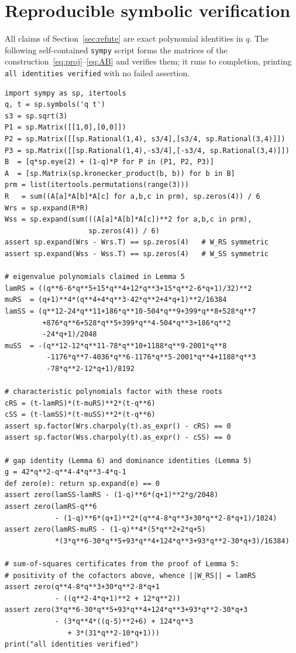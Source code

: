 \documentclass[11pt]{article}
\theoremstyle{definition}
\theoremstyle{remark}
\begin{document}
\newpage

\appendix
\section{Reproducible symbolic verification}\label{app:verify}

All claims of Section~\ref{sec:refute} are exact polynomial identities in $q$. The following
self-contained \texttt{sympy} script forms the matrices of the
construction~\eqref{eq:proj}--\eqref{eq:AB} and verifies them; it runs to completion, printing
\texttt{all identities verified} with no failed assertion.

{\footnotesize
\begin{verbatim}
import sympy as sp, itertools
q, t = sp.symbols('q t')
s3 = sp.sqrt(3)
P1 = sp.Matrix([[1,0],[0,0]])
P2 = sp.Matrix([[sp.Rational(1,4), s3/4],[s3/4, sp.Rational(3,4)]])
P3 = sp.Matrix([[sp.Rational(1,4),-s3/4],[-s3/4, sp.Rational(3,4)]])
B  = [q*sp.eye(2) + (1-q)*P for P in (P1, P2, P3)]
A  = [sp.Matrix(sp.kronecker_product(b, b)) for b in B]
prm = list(itertools.permutations(range(3)))
R   = sum((A[a]*A[b]*A[c] for a,b,c in prm), sp.zeros(4)) / 6
Wrs = sp.expand(R*R)
Wss = sp.expand(sum(((A[a]*A[b]*A[c])**2 for a,b,c in prm),
                    sp.zeros(4)) / 6)
assert sp.expand(Wrs - Wrs.T) == sp.zeros(4)   # W_RS symmetric
assert sp.expand(Wss - Wss.T) == sp.zeros(4)   # W_SS symmetric

# eigenvalue polynomials claimed in Lemma 5
lamRS = ((q**6-6*q**5+15*q**4+12*q**3+15*q**2-6*q+1)/32)**2
muRS  = (q+1)**4*(q**4+4*q**3-42*q**2+4*q+1)**2/16384
lamSS = (q**12-24*q**11+186*q**10-504*q**9+399*q**8+528*q**7
         +876*q**6+528*q**5+399*q**4-504*q**3+186*q**2
         -24*q+1)/2048
muSS  = -(q**12-12*q**11-78*q**10+1188*q**9-2001*q**8
          -1176*q**7-4036*q**6-1176*q**5-2001*q**4+1188*q**3
          -78*q**2-12*q+1)/8192

# characteristic polynomials factor with these roots
cRS = (t-lamRS)*(t-muRS)**2*(t-q**6)
cSS = (t-lamSS)*(t-muSS)**2*(t-q**6)
assert sp.factor(Wrs.charpoly(t).as_expr() - cRS) == 0
assert sp.factor(Wss.charpoly(t).as_expr() - cSS) == 0

# gap identity (Lemma 6) and dominance identities (Lemma 5)
g = 42*q**2-q**4-4*q**3-4*q-1
def zero(e): return sp.expand(e) == 0
assert zero(lamSS-lamRS - (1-q)**6*(q+1)**2*g/2048)
assert zero(lamRS-q**6
            - (1-q)**6*(q+1)**2*(q**4-8*q**3+30*q**2-8*q+1)/1024)
assert zero(lamRS-muRS - (1-q)**4*(5*q**2+2*q+5)
            *(3*q**6-30*q**5+93*q**4+124*q**3+93*q**2-30*q+3)/16384)

# sum-of-squares certificates from the proof of Lemma 5:
# positivity of the cofactors above, whence ||W_RS|| = lamRS
assert zero(q**4-8*q**3+30*q**2-8*q+1
            - ((q**2-4*q+1)**2 + 12*q**2))
assert zero(3*q**6-30*q**5+93*q**4+124*q**3+93*q**2-30*q+3
            - (3*q**4*((q-5)**2+6) + 124*q**3
               + 3*(31*q**2-10*q+1)))
print("all identities verified")
\end{verbatim}
}
\end{document}
